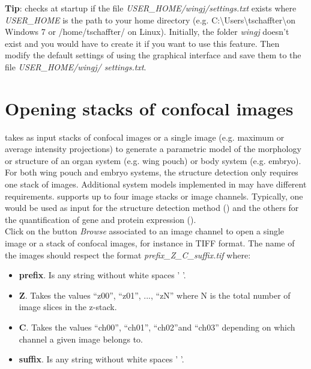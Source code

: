 \textbf{Tip}: \wingj checks at startup if the file \textit{USER\_HOME/wingj/settings.txt} exists where \textit{USER\_HOME} is the path to your home directory (e.g. C:\textbackslash Users\textbackslash tschaffter\textbackslash on Windows 7 or /home/tschaffter/ on Linux). Initially, the folder \textit{wingj} doesn't exist and you would have to create it if you want to use this feature. Then modify the default settings of \wingj using the graphical interface and save them to the file \textit{USER\_HOME/wingj/ settings.txt}.

\section{Opening stacks of confocal images} \label{sec:open_images}
\wingj takes as input stacks of confocal images or a single image (e.g. maximum or average intensity projections) to generate a parametric model of the morphology or structure of an organ system (e.g. \droso wing pouch) or body system (e.g. \droso embryo). For both wing pouch and embryo systems, the structure detection only requires one stack of images. Additional system models implemented in \wingj may have different requirements. \wingj supports up to four image stacks or image channels. Typically, one would be used as input for the structure detection method () and the others for the quantification of gene and protein expression ().\\

Click on the button \textit{Browse} associated to an image channel to open a single image or a stack of confocal images, for instance in TIFF format. The name of the images should respect the format \textit{prefix\_Z\_C\_suffix.tif} where:

\begin{itemize}
 \item \textbf{prefix}. Is any string without white spaces ' '.
 \item \textbf{Z}. Takes the values ``z00'', ``z01'', ..., ``zN'' where N is the total number of image slices in the z-stack.
 \item \textbf{C}. Takes the values ``ch00'', ``ch01'', ``ch02''and ``ch03'' depending on which channel a given image belongs to.
 \item \textbf{suffix}. Is any string without white spaces ' '.
\end{itemize}


